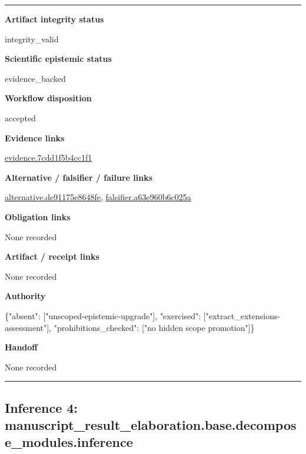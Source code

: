 \documentclass[10pt,a4paper]{article}
\newcommand{\TraceField}[2]{\par\noindent\textbf{#1}\par\noindent #2\par\smallskip}
\newenvironment{TraceDossier}{\par\medskip\noindent\hrule\medskip}{\medskip\hrule\par\medskip}
\begin{document}
\begin{TraceDossier}
\TraceField{Artifact integrity status}{integrity\_\allowbreak{}valid}

\TraceField{Scientific epistemic status}{evidence\_\allowbreak{}backed}

\TraceField{Workflow disposition}{accepted}

\TraceField{Evidence links}{\hyperlink{trace-evidence-b9d65f555ede6f747e}{evidence.\allowbreak{}7cdd1f5b4c\allowbreak{}c1f1}}

\TraceField{Alternative / falsifier / failure links}{\hyperlink{trace-alternative-8943727d0d492cbc41}{alternativ\allowbreak{}e.\allowbreak{}de91175e86\allowbreak{}48fe}, \hyperlink{trace-alternative-55cd6aa6fb3b62fe45}{falsifier.\allowbreak{}a63e960b6c\allowbreak{}025a}}

\TraceField{Obligation links}{None recorded}

\TraceField{Artifact / receipt links}{None recorded}

\TraceField{Authority}{\{"absent":\allowbreak{} ["unscoped\allowbreak{}-\allowbreak{}epistemic-\allowbreak{}upgrade"],\allowbreak{} "exercised\allowbreak{}":\allowbreak{} ["extract\_\allowbreak{}extensions\allowbreak{}-\allowbreak{}assessment\allowbreak{}"], "prohibiti\allowbreak{}ons\_\allowbreak{}checked":\allowbreak{} ["no hidden scope promotion"\allowbreak{}]\}}

\TraceField{Handoff}{None recorded}

\end{TraceDossier}
\pagebreak[2]\subsection{Inference 4: manuscript\allowbreak{}\_\allowbreak{}result\_\allowbreak{}elaboratio\allowbreak{}n.\allowbreak{}base.\allowbreak{}decompose\_\allowbreak{}modules.\allowbreak{}inference}\label{trace-inference-414b003ae8dc4b01a7}
\end{document}
